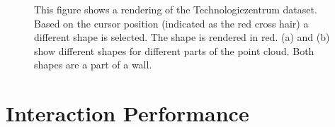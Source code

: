 \begin{figure}
\centering
{}
\caption[Two examples of user-guided shape detection]
{This figure shows a rendering of the Technologiezentrum dataset. Based on the cursor position (indicated as the red cross hair) a different shape is selected. The shape is rendered in red. (a) and (b) show different shapes for different parts of the point cloud. Both shapes are a part of a wall.}
\label{fig:technologiezentrum_interactive_shape_detection}
\end{figure}


\section{Interaction Performance}
\label{sec:interaction_performance}

